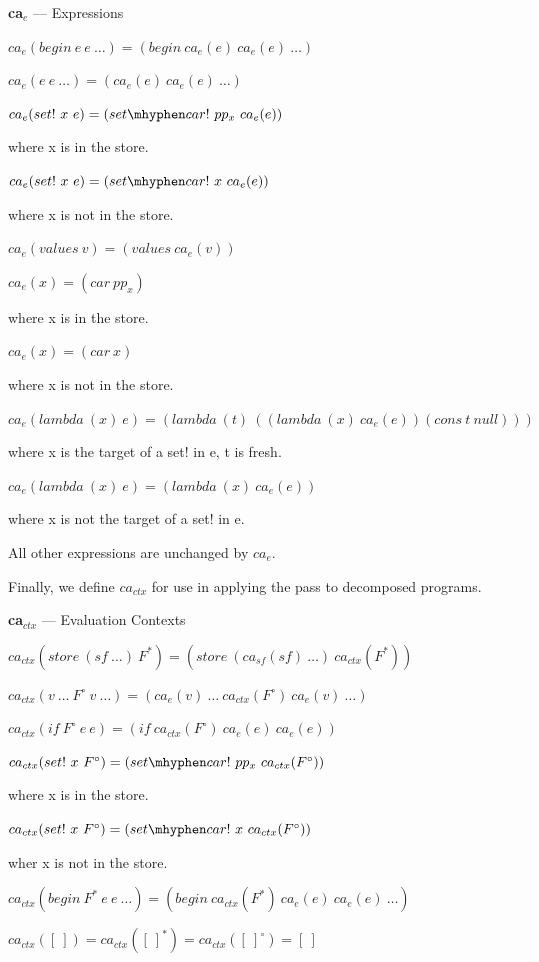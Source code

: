 \begin{definition} {\large\textbf{ca$_e$}} --- Expressions

$ca_e(begin\ e\ e\ \dots) = (begin\ ca_e(e)\ ca_e(e)\ \dots)$

$ca_e(e\ e\ \dots) = (ca_e(e)\ ca_e(e)\ \dots)$

$ca_e(set!\ x\ e) = (set \mhyphen car!\ pp_x\ ca_e(e))$

\qquad where x is in the store.

$ca_e(set!\ x\ e) = (set \mhyphen car!\ x\ ca_e(e))$

\qquad where x is not in the store.

$ca_e(values\ v) = (values\ ca_e(v))$

$ca_e(x) = (car\ pp_x)$

\qquad where x is in the store.

$ca_e(x) = (car\ x)$

\qquad where x is not in the store.

$ca_e(lambda\ (x)\ e) = (lambda\ (t)\ ((lambda\ (x)\ ca_e(e))(cons\ t\ null)))$

\qquad where x is the target of a set! in e, t is fresh.

$ca_e(lambda\ (x)\ e) = (lambda\ (x)\ ca_e(e))$ 

\qquad where x is not the target of a set! in e.

All other expressions are unchanged by $ca_e$.

\end{definition}

Finally, we define $ca_{ctx}$ for use in applying the pass to decomposed programs.

\begin{definition} {\large\textbf{ca$_{ctx}$}} --- Evaluation Contexts

$ca_{ctx}(store\ (sf\ \dots)\ F^{*}) = (store\ (ca_{sf}(sf)\ \dots)\ ca_{ctx}(F^{*}))$

$ca_{ctx}(v\ \dots\ F^{\circ}\ v\ \dots) = (ca_e(v)\ \dots\ ca_{ctx}(F^{\circ})\ ca_e(v)\ \dots)$

$ca_{ctx}(if\ F^{\circ}\ e\ e) = (if\ ca_{ctx}(F^{\circ})\ ca_e(e)\ ca_e(e))$

$ca_{ctx}(set!\ x\ F^{\circ}) = (set \mhyphen car!\ pp_x\ ca_{ctx}(F^{\circ}))$

\qquad where x is in the store.

$ca_{ctx}(set!\ x\ F^{\circ}) = (set \mhyphen car!\ x\ ca_{ctx}(F^{\circ}))$

\qquad wher x is not in the store.

$ca_{ctx}(begin\ F^{*}\ e\ e\ \dots) = (begin\ ca_{ctx}(F^{*})\ ca_e(e)\ ca_e(e)\ \dots)$

$ca_{ctx}([\ ]) = ca_{ctx}([\ ]^{*}) = ca_{ctx}([\ ]^{\circ}) = [\ ]$

\end{definition}

